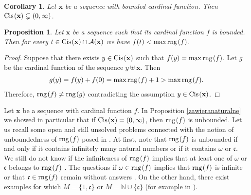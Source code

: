 \documentclass{amsart}
\newtheorem{proposition}[theorem]{Proposition}
\newtheorem{corollary}[theorem]{Corollary}
\theoremstyle{definition}
\newcommand{\rng}{{\rm rng} \hspace{0.03cm}}
\newcommand{\Cis}{{\rm Cis} \hspace{0.03cm}}
\begin{document}
\begin{corollary} 
Let $\mathbf{x}$ be a sequence with bounded cardinal function. Then $\Cis (\mathbf{x})\subsetneq (0,\infty)$.
\end{corollary}

\begin{proposition}
Let $\mathbf{x}$ be a sequence such that its cardinal function $f$ is bounded. Then for every $t\in \Cis (\mathbf{x})\cap\mathcal{A}(\mathbf{x})$ we have $f(t)<\max\rng (f)$.
\end{proposition}
\begin{proof}
Suppose that there exists $y\in \Cis (\mathbf{x})$ such that $f(y)=\max\rng (f)$. Let $g$ be the cardinal function of the sequence $y\uplus \textbf{x}$. Then
\begin{align*}
g(y)=f(y)+f(0) = \max\rng (f) + 1 >\max\rng (f).
\end{align*}
Therefore, $\rng (f)\neq\rng (g)$ contradicting the assumption $y\in\Cis(\mathbf{x})$.
\end{proof}




 
Let $\textbf{x}$ be a sequence with cardinal function $f$. In Proposition \ref{zawieranaturalne} we  showed in particular that if $\Cis (\textbf{x})=(0,\infty)$, then $\rng (f)$ is unbounded. 
Let us recall some open and still unsolved problems connected with the notion of unboundedness of $\rng (f)$ posed in \cite{cardfun}.
At first, note that $\rng (f)$ is unbounded if and only if it contains infinitely many natural numbers or if it contains $\omega$ or $\mathfrak{c}$. We still do not know if the infiniteness of $\rng (f)$ implies that at least one of $\omega$ or $\mathfrak{c}$ belongs to $\rng (f)$ \cite[Problem 2.12]{cardfun}. The questions if $\omega\in \rng (f)$ implies that $\rng (f)$ is infinite or that $\mathfrak{c}\in \rng (f)$ remain without answers \cite[Problems 2.9 and 2.13]{cardfun}. On the other hand, there exist examples for which $M=\{1,\mathfrak{c}\}$ or $M=\mathbb{N}\cup\{\mathfrak{c}\}$ (for example in \cite[Proposition 2.5]{cardfun}).
\end{document}
